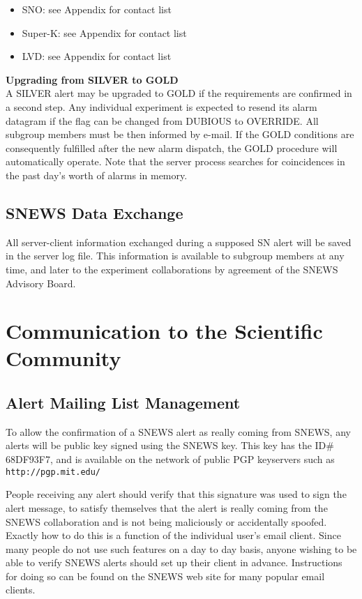 \documentclass{article}
\begin{document}
\begin{itemize}

\item SNO: see Appendix for contact list
\item Super-K: see Appendix for contact list
\item LVD: see Appendix for contact list

\end{itemize}


\noindent \textbf{Upgrading from SILVER to GOLD}\\
A SILVER alert may be upgraded to GOLD if the requirements are
confirmed in a second step. Any individual experiment is expected to
resend its alarm datagram if the flag can be changed from DUBIOUS to
OVERRIDE. All subgroup members must be then informed by
e-mail. If the GOLD conditions are consequently fulfilled after the
new alarm dispatch, the GOLD procedure will automatically operate.
Note that the server process searches for coincidences
in the past day's worth of alarms in memory.

\subsection{SNEWS Data Exchange}

All server-client information
exchanged during a supposed SN alert will be saved
in the server log file. This information is available to subgroup
members at any time, and later to the experiment collaborations
by agreement of the SNEWS Advisory Board.



\section{Communication to the Scientific Community}

\subsection{Alert Mailing List Management}

To allow the confirmation of a SNEWS alert as really coming from SNEWS,
any alerts will be public key signed using the SNEWS key.  This key has
the ID\# 68DF93F7, and is available on the network of public PGP
keyservers such as \texttt{http://pgp.mit.edu/}

People receiving any alert should verify that this signature was used to
sign the alert message, to satisfy themselves that the alert is really
coming from the SNEWS collaboration and is not being maliciously or
accidentally spoofed.  Exactly how to do this is a function of the
individual user's email client.  Since many people do not use such
features on a day to day basis, anyone wishing to be able to verify
SNEWS alerts should set up their client in advance.  Instructions for
doing so can be found on the SNEWS web site for many popular email
clients.  
\end{document}
